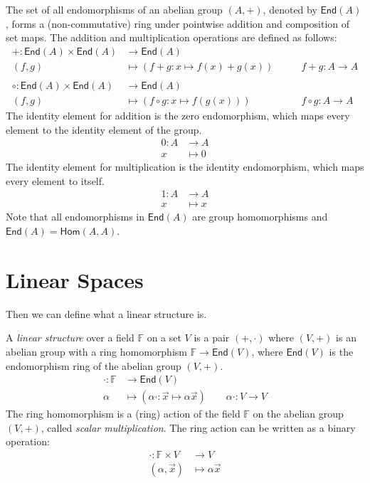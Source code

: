 \documentclass[
	11pt, %
	fleqn, %
	a4paper, %
]{LegrandOrangeBook}
\newcommand{\End}[1]{\mathsf{End}(#1)} %
\newcommand{\Hom}{\mathsf{Hom}} %
\newcommand{\F}{\mathbb{F}} %
\begin{document}
\begin{definition}
    The set of all endomorphisms of an abelian group $(A, +)$, denoted by $\End{A}$, forms a (non-commutative) ring under pointwise addition and composition of set maps. The addition and multiplication operations are defined as follows:
    \[
        \begin{split}
            + : \End{A} \times \End{A} &\to \End{A} \\
            (f,g) &\mapsto (f+g: x \mapsto f(x) + g(x)) \qquad &f + g : A \to A \\ \\
            \circ : \End{A} \times \End{A} &\to \End{A} \\
            (f,g) &\mapsto (f \circ g: x \mapsto f(g(x))) \qquad &f \circ g : A \to A
        \end{split}
    \]
    The identity element for addition is the zero endomorphism, which maps every element to the identity element of the group. 
    \[ \begin{split}
        0: A &\to A \\
        x &\mapsto 0
    \end{split}
    \]
    The identity element for multiplication is the identity endomorphism, which maps every element to itself. 
    \[
    \begin{split}
        1: A &\to A \\
        x &\mapsto x
    \end{split}
    \]
    Note that all endomorphisms in $\End{A}$ are group homomorphisms and $\End{A} = \Hom(A, A)$.
\end{definition}

\newpage

\section{Linear Spaces}

Then we can define what a linear structure is.

\begin{definition}
    A \emph{linear structure} over a field $\F$ on a set $V$ is a pair $(+, \cdot)$ where $(V, +)$ is an abelian group with a ring homomorphism $\F \to \End{V}$, where $\End{V}$ is the endomorphism ring of the abelian group $(V, +)$.
    \[ \begin{split}
            \cdot : \F &\to \End{V} \\
            \alpha &\mapsto (\alpha\cdot : \vec{x} \mapsto \alpha \vec{x}) \qquad \alpha \cdot : V \to V
        \end{split}
    \]
    The ring homomorphism is a (ring) action of the field $\F$ on the abelian group $(V, +)$, called \emph{scalar multiplication}. The ring action can be written as a binary operation:
    \[
        \begin{split}
            \cdot : \F \times V &\to V \\
            (\alpha, \vec{x}) &\mapsto \alpha \vec{x}
        \end{split}
    \]
\end{definition}
\end{document}
